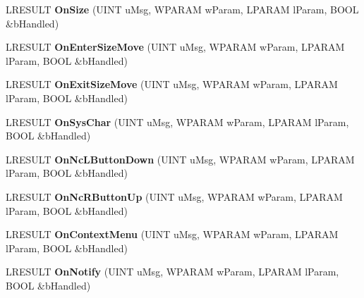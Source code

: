 \begin{DoxyCompactItemize}
\mbox{\label{class_c_tray_window_ab1e802cd4058608f1f580f80d7ac0d7d}} 
L\+R\+E\+S\+U\+LT {\bfseries On\+Size} (U\+I\+NT u\+Msg, W\+P\+A\+R\+AM w\+Param, L\+P\+A\+R\+AM l\+Param, B\+O\+OL \&b\+Handled)
\item 
\mbox{\label{class_c_tray_window_a08b68806a49338b4b4c762eaa9eda9a6}} 
L\+R\+E\+S\+U\+LT {\bfseries On\+Enter\+Size\+Move} (U\+I\+NT u\+Msg, W\+P\+A\+R\+AM w\+Param, L\+P\+A\+R\+AM l\+Param, B\+O\+OL \&b\+Handled)
\item 
\mbox{\label{class_c_tray_window_a17985ed143542033521ccf80b912cbd4}} 
L\+R\+E\+S\+U\+LT {\bfseries On\+Exit\+Size\+Move} (U\+I\+NT u\+Msg, W\+P\+A\+R\+AM w\+Param, L\+P\+A\+R\+AM l\+Param, B\+O\+OL \&b\+Handled)
\item 
\mbox{\label{class_c_tray_window_a9004863bf2853a8ed27025a2cb679b47}} 
L\+R\+E\+S\+U\+LT {\bfseries On\+Sys\+Char} (U\+I\+NT u\+Msg, W\+P\+A\+R\+AM w\+Param, L\+P\+A\+R\+AM l\+Param, B\+O\+OL \&b\+Handled)
\item 
\mbox{\label{class_c_tray_window_a7cd95eb6594f1468fdff023711946fff}} 
L\+R\+E\+S\+U\+LT {\bfseries On\+Nc\+L\+Button\+Down} (U\+I\+NT u\+Msg, W\+P\+A\+R\+AM w\+Param, L\+P\+A\+R\+AM l\+Param, B\+O\+OL \&b\+Handled)
\item 
\mbox{\label{class_c_tray_window_a5edc7349e65dc7d3159e32d7430fbd0e}} 
L\+R\+E\+S\+U\+LT {\bfseries On\+Nc\+R\+Button\+Up} (U\+I\+NT u\+Msg, W\+P\+A\+R\+AM w\+Param, L\+P\+A\+R\+AM l\+Param, B\+O\+OL \&b\+Handled)
\item 
\mbox{\label{class_c_tray_window_a85f248c106aa2fa5669cfe7874fb283d}} 
L\+R\+E\+S\+U\+LT {\bfseries On\+Context\+Menu} (U\+I\+NT u\+Msg, W\+P\+A\+R\+AM w\+Param, L\+P\+A\+R\+AM l\+Param, B\+O\+OL \&b\+Handled)
\item 
\mbox{\label{class_c_tray_window_a57b9b402a114fcb864960193e2b9859b}} 
L\+R\+E\+S\+U\+LT {\bfseries On\+Notify} (U\+I\+NT u\+Msg, W\+P\+A\+R\+AM w\+Param, L\+P\+A\+R\+AM l\+Param, B\+O\+OL \&b\+Handled)
\item 
\mbox{\label{class_c_tray_window_a7c9537e40aa3bf2bca9027b0dde8f64a}} 

\end{DoxyCompactItemize}
